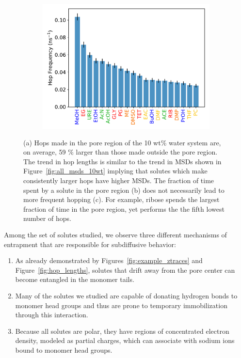 \documentclass{article}
\begin{document}
\begin{figure}[!htb]
\begin{subfigure}{0.325\textwidth}
  \includegraphics[width=\textwidth]{hopfreq_total.pdf}
  \caption{}\label{fig:hopfreq}
  \end{subfigure}
  \caption{(a) Hops made in the pore region of the 10 wt\% water system
  are, on average, 59 \% larger than those made outside the pore region.
  The trend in hop lengths is similar to the trend in MSDs shown in
  Figure~\ref{fig:all_msds_10wt} implying that solutes which make consistently
  larger hops have higher MSDs. The fraction of time spent by a solute in the
  pore region (b) does not necessarily lead to more frequent hopping (c). For
  example, ribose spends the largest fraction of time in the pore region, yet
  performs the the fifth lowest number of hops.}\label{fig:hops}
  \end{figure}
  
  Among the set of solutes studied, we observe three different mechanisms 
  of entrapment that are responsible for subdiffusive behavior:
  \begin{enumerate}
    \item As already demonstrated by Figures~\ref{fig:example_ztraces} and 
    Figure~\ref{fig:hop_lengths}, solutes that drift away from the pore center
    can become entangled in the monomer tails. 
    \item Many of the solutes we studied are capable of donating hydrogen bonds to
    monomer head groups and thus are prone to temporary immobilization through 
    this interaction.
    \item Because all solutes are polar, they have regions of concentrated electron
    density, modeled as partial charges, which can associate with sodium ions
    bound to monomer head groups.
  \end{enumerate}
  
\end{document}
